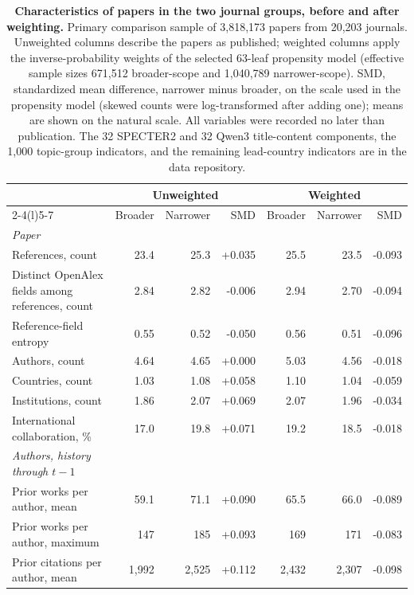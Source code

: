 \begin{table}[H]
\centering
\caption{\textbf{Characteristics of papers in the two journal groups, before and after weighting.}
Primary comparison sample of 3,818,173 papers from 20,203 journals. Unweighted columns describe the
papers as published; weighted columns apply the inverse-probability weights of the selected 63-leaf
propensity model (effective sample sizes 671,512 broader-scope and 1,040,789 narrower-scope). SMD,
standardized mean difference, narrower minus broader, on the scale used in the propensity model
(skewed counts were log-transformed after adding one); means are shown on the natural scale. All variables
were recorded no later than publication. The 32 SPECTER2 and 32 Qwen3 title-content components,
the 1,000 topic-group indicators, and the remaining lead-country indicators are in the data repository.}
\label{tab:characteristics}
\scriptsize
\renewcommand{\arraystretch}{0.92}
\setlength{\tabcolsep}{4pt}
\begin{tabular}{@{}lrrrrrr@{}}
\toprule
 & \multicolumn{3}{c}{Unweighted} & \multicolumn{3}{c}{Weighted} \\
\cmidrule(lr){2-4}\cmidrule(l){5-7}
 & Broader & Narrower & SMD & Broader & Narrower & SMD \\
\midrule
\addlinespace[3pt]\emph{Paper} & & & & & & \\
\quad References, count & 23.4 & 25.3 & +0.035 & 25.5 & 23.5 & -0.093 \\
\quad Distinct OpenAlex fields among references, count & 2.84 & 2.82 & -0.006 & 2.94 & 2.70 & -0.094 \\
\quad Reference-field entropy & 0.55 & 0.52 & -0.050 & 0.56 & 0.51 & -0.096 \\
\quad Authors, count & 4.64 & 4.65 & +0.000 & 5.03 & 4.56 & -0.018 \\
\quad Countries, count & 1.03 & 1.08 & +0.058 & 1.10 & 1.04 & -0.059 \\
\quad Institutions, count & 1.86 & 2.07 & +0.069 & 2.07 & 1.96 & -0.034 \\
\quad International collaboration, \% & 17.0 & 19.8 & +0.071 & 19.2 & 18.5 & -0.018 \\
\addlinespace[3pt]\emph{Authors, history through $t-1$} & & & & & & \\
\quad Prior works per author, mean & 59.1 & 71.1 & +0.090 & 65.5 & 66.0 & -0.089 \\
\quad Prior works per author, maximum & 147 & 185 & +0.093 & 169 & 171 & -0.083 \\
\quad Prior citations per author, mean & 1,992 & 2,525 & +0.112 & 2,432 & 2,307 & -0.098 \\

\end{tabular}
\end{table}
